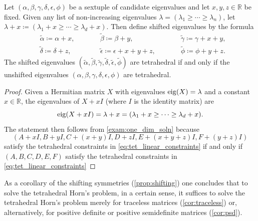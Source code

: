 \documentclass[notitlepage, 10pt]{article}
\begin{document}
\begin{prop}
    \label{prop:shifting}
    Let $(\alpha, \beta, \gamma, \delta, \epsilon, \phi)$ be a sextuple of candidate eigenvalues and let $x,y,z \in \mathbb R$ be fixed.
    Given any list of non-increasing eigenvalues $\lambda = (\lambda_1 \geq \cdots \geq \lambda_n)$, let $\lambda + x \coloneqq (\lambda_1 + x \geq \cdots \geq \lambda_d + x)$.
    Then define shifted eigenvalues by the formula
    \begin{equation}
        \label{eq:shifted_tet_eigenvalues}
        \begin{alignedat}{3}
             &\tilde \alpha     \coloneqq \alpha + x, \qquad
            &&\tilde \beta      \coloneqq \beta + y, \qquad
            &&\tilde \gamma     \coloneqq \gamma + x + y, \\
             &\tilde \delta     \coloneqq \delta + z, \qquad
            &&\tilde \epsilon   \coloneqq \epsilon + x + y + z, \qquad
            &&\tilde \phi       \coloneqq \phi + y + z.
        \end{alignedat}
    \end{equation}
    The shifted eigenvalues $(\tilde \alpha, \tilde \beta, \tilde \gamma, \tilde \delta, \tilde \epsilon,\tilde \phi)$ are tetrahedral if and only if the unshifted eigenvalues $(\alpha, \beta, \gamma, \delta, \epsilon, \phi)$ are tetrahedral.
\end{prop}
\begin{proof}
    Given a Hermitian matrix $X$ with eigenvalues $\operatorname{eig}(X) = \lambda$ and a constant $x \in \mathbb R$, the eigenvalues of $X+xI$ (where $I$ is the identity matrix) are
    \begin{equation}
        \operatorname{eig}(X+xI) = \lambda + x = (\lambda_1 + x \geq \cdots \geq \lambda_d + x).
    \end{equation}
    The statement then follows from \cref{exam:one_dim_soln} because 
    \begin{equation}
        (A+xI,B+yI,C+(x+y)I,D+zI, E+(x+y+z)I, F+(y+z)I)
    \end{equation}
    satisfy the tetrahedral constraints in \cref{eq:tet_linear_constraints} if and only if $(A,B,C,D,E,F)$ satisfy the tetrahedral constraints in \cref{eq:tet_linear_constraints}
\end{proof}
As a corollary of the shifting symmetries (\cref{prop:shifting}) one concludes that to solve the tetrahedral Horn's problem, in a certain sense, it suffices to solve the tetrahedral Horn's problem merely for traceless matrices (\cref{cor:traceless}) or, alternatively, for positive definite or positive semidefinite matrices (\cref{cor:psd}).
\end{document}
